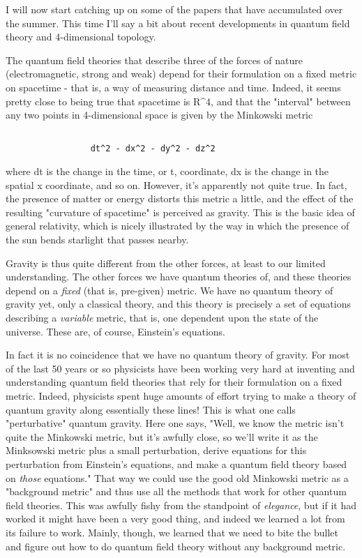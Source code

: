 

I will now start catching up on some of the papers that have accumulated
over the summer.  This time I'll say a bit about recent developments in
quantum field theory and 4-dimensional topology.  

The quantum field theories that describe three of the forces of nature
(electromagnetic, strong and weak) depend for their formulation on a
fixed metric on spacetime - that is, a way of measuring distance and
time.  Indeed, it seems pretty close to being true that spacetime is
R^4, and that the "interval" between any two points in 4-dimensional
space is given by the Minkowski metric 


\begin{verbatim}

                 dt^2 - dx^2 - dy^2 - dz^2  
\end{verbatim}
    

where dt is the change in the time, or t, coordinate, dx is the change
in the spatial x coordinate, and so on.  However, it's apparently not
quite true.  In fact, the presence of matter or energy distorts this
metric a little, and the effect of the resulting "curvature of
spacetime" is perceived as gravity.  This is the basic idea of general
relativity, which is nicely illustrated by the way in which the presence
of the sun bends starlight that passes nearby.  

Gravity is thus quite different from the other forces, at least to our
limited understanding.  The other forces we have quantum theories of,
and these theories depend on a \emph{fixed} (that is, pre-given) metric.
We have no quantum theory of gravity yet, only a classical theory,
and this theory is precisely a set of equations describing a \emph{variable}
metric, that is, one dependent upon the state of the universe.   These
are, of course, Einstein's equations.

In fact it is no coincidence that we have no quantum theory of gravity.
For most of the last 50 years or so physicists have been working very
hard at inventing and understanding quantum field theories that rely for
their formulation on a fixed metric.  Indeed, physicists spent huge
amounts of effort trying to make a theory of quantum gravity along
essentially these lines!  This is what one calls "perturbative" quantum
gravity.  Here one says, "Well, we know the metric isn't quite the
Minkowski metric, but it's awfully close, so we'll write it as the
Minksowski metric plus a small perturbation, derive equations for this
perturbation from Einstein's equations, and make a quantum field theory
based on \emph{those} equations."  That way we could use the good old
Minkowski metric as a "background metric" and thus use all the methods
that work for other quantum field theories.   This was awfully fishy
from the standpoint of \emph{elegance}, but if it had worked it might have
been a very good thing, and indeed we learned a lot from its failure to
work.  Mainly, though, we learned that we need to bite the bullet and
figure out how to do quantum field theory without any background metric.


